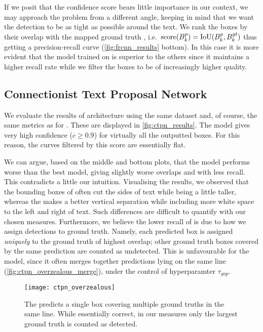 			If we posit that the confidence score bears little importance in our context, we may approach the problem from a different angle, keeping in mind that we want the detection to be as tight as possible around the text. We rank the boxes by their overlap with the mapped ground truth
			, i.e.\ \(\operatorname{score}(B^p_k) = \operatorname{IoU}(B^p_k, B^{gt}_k)\) thus getting a precision-recall curve (\autoref{fig:frcnn_results} bottom).
			In this case it is more evident that the model trained on  is superior to the others since it maintains a higher recall rate while we filter the boxes to be of increasingly higher quality.


	\vspace*{-1em}
	\subsection{Connectionist Text Proposal Network}\label{sec:ctpn_results}
		We evaluate the results of \CTPN{} architecture using the same  dataset and, of course, the same metrics as for \FRCNN{}. These are displayed in \autoref{fig:ctpn_results}. The \CTPN{} model gives very high confidence (\(c \geq 0.9\)) for virtually all the outputted boxes. For this reason, the curves filtered by this score are essentially flat.

		We can argue, based on the middle and bottom plots, that the model performs worse than the best \FRCNN{} model, giving slightly worse overlaps and with less recall. This contradicts a little our intuition. Visualising the results, we observed that the bounding boxes of \FRCNN{} often cut the sides of text while being a little taller, whereas the \CTPN{} makes a better vertical separation while including more white space to the left and right of text. Such differences are difficult to quantify with our chosen measures. Furthermore, we believe the lower recall of \CTPN{} is due to how we assign detections to ground truth. Namely, each predicted box is assigned \emph{uniquely} to the ground truth of highest overlap; other ground truth boxes covered by the same prediction are counted as undetected. This is unfavourable for the model, since it often merges together predictions lying on the same line (\autoref{fig:ctpn_overzealous_merge}), under the control of hyperparamter \(\tau_{gap}\).
		\vspace*{-0.25em}
		\begin{figure}[htb]
			\texttt{[image: ctpn\_overzealous]}
			\caption[\CTPN{} overzealous merging]{The \CTPN{} predicts a single box covering multiple ground truths in the same line.
			While essentially correct,
			in our measures only the largest ground truth is counted as detected.
			}
			\label{fig:ctpn_overzealous_merge}
		\end{figure}

